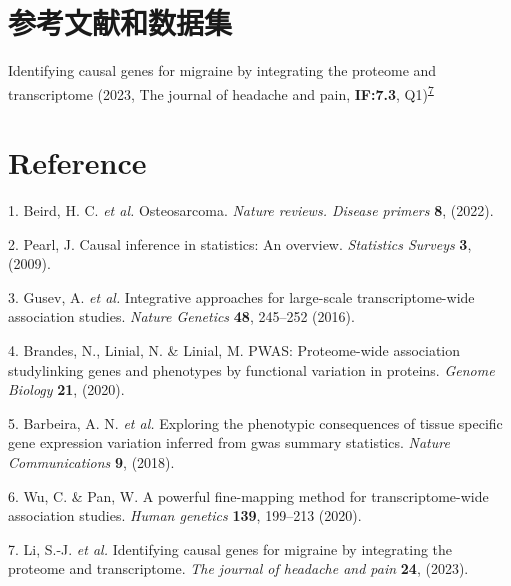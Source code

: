 \documentclass[
]{article}
\newenvironment{cslreferences}%
  {}%
  {\par}
\begin{document}
\hypertarget{workflow}{%
\section{参考文献和数据集}\label{workflow}}

Identifying causal genes for migraine by integrating the proteome and transcriptome
(2023, The journal of headache and pain, \textbf{IF:7.3}, Q1)\textsuperscript{\protect\hyperlink{ref-IdentifyingCauLiSh2023}{7}}

\hypertarget{bibliography}{%
\section*{Reference}\label{bibliography}}

\hypertarget{refs}{}
\begin{cslreferences}
\leavevmode\hypertarget{ref-OsteosarcomaBeird2022}{}%
1. Beird, H. C. \emph{et al.} Osteosarcoma. \emph{Nature reviews. Disease primers} \textbf{8}, (2022).

\leavevmode\hypertarget{ref-CausalInferencPearl2009}{}%
2. Pearl, J. Causal inference in statistics: An overview. \emph{Statistics Surveys} \textbf{3}, (2009).

\leavevmode\hypertarget{ref-IntegrativeAppGusev2016}{}%
3. Gusev, A. \emph{et al.} Integrative approaches for large-scale transcriptome-wide association studies. \emph{Nature Genetics} \textbf{48}, 245--252 (2016).

\leavevmode\hypertarget{ref-PwasProteomeBrande2020}{}%
4. Brandes, N., Linial, N. \& Linial, M. PWAS: Proteome-wide association studylinking genes and phenotypes by functional variation in proteins. \emph{Genome Biology} \textbf{21}, (2020).

\leavevmode\hypertarget{ref-ExploringThePBarbei2018}{}%
5. Barbeira, A. N. \emph{et al.} Exploring the phenotypic consequences of tissue specific gene expression variation inferred from gwas summary statistics. \emph{Nature Communications} \textbf{9}, (2018).

\leavevmode\hypertarget{ref-APowerfulFineWuCh2020}{}%
6. Wu, C. \& Pan, W. A powerful fine-mapping method for transcriptome-wide association studies. \emph{Human genetics} \textbf{139}, 199--213 (2020).

\leavevmode\hypertarget{ref-IdentifyingCauLiSh2023}{}%
7. Li, S.-J. \emph{et al.} Identifying causal genes for migraine by integrating the proteome and transcriptome. \emph{The journal of headache and pain} \textbf{24}, (2023).
\end{cslreferences}
\end{document}
